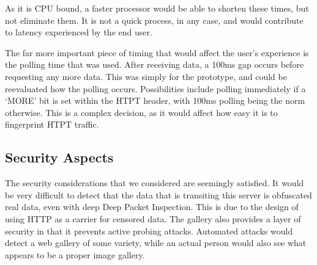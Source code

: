 As it is CPU bound, a faster processor would be able to shorten these times, but not eliminate them. It is not a quick process, in any case, and would contribute to latency experienced by the end user. 

The far more important piece of timing that would affect the user's experience is the polling time that was used. After receiving data, a 100ms gap occurs before requesting any more data. This was simply for the prototype, and could be reevaluated how the polling occurs. Possibilities include polling immediately if a `MORE' bit is set within the HTPT header, with 100ms polling being the norm otherwise. This is a complex decision, as it would affect how easy it is to fingerprint HTPT traffic. 




\subsection{Security Aspects}
The security considerations that we considered are seemingly satisfied. It would be very difficult to detect that the data that is transiting this server is obfuscated real data, even with deep Deep Packet Inspection. This is due to the design of using HTTP as a carrier for censored data. The gallery also provides a layer of security in that it prevents active probing attacks. Automated attacks would detect a web gallery of some variety, while an actual person would also see what appears to be a proper image gallery.